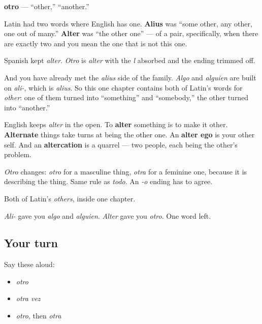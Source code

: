 \begin{cousinweb}
\textbf{otro} — \textquotedblleft{}other,\textquotedblright{} \textquotedblleft{}another.\textquotedblright{}

Latin had two words where English has one. \textbf{Alius} was \textquotedblleft{}some other, any other, one out of many.\textquotedblright{} \textbf{Alter} was \textquotedblleft{}the other one\textquotedblright{} — of a pair, specifically, when there are exactly two and you mean the one that is not this one.

Spanish kept \emph{alter}. \emph{Otro} is \emph{alter} with the \emph{l} absorbed and the ending trimmed off.

And you have already met the \emph{alius} side of the family. \emph{Algo} and \emph{alguien} are built on \emph{ali-}, which is \emph{alius}. So this one chapter contains both of Latin's words for \emph{other}: one of them turned into \textquotedblleft{}something\textquotedblright{} and \textquotedblleft{}somebody,\textquotedblright{} the other turned into \textquotedblleft{}another.\textquotedblright{}

English keeps \emph{alter} in the open. To \textbf{alter} something is to make it other. \textbf{Alternate} things take turns at being the other one. An \textbf{alter ego} is your other self. And an \textbf{altercation} is a quarrel — two people, each being the other's problem.

\emph{Otro} changes: \emph{otro} for a masculine thing, \emph{otra} for a feminine one, because it is describing the thing. Same rule as \emph{todo}. An \emph{-o} ending has to agree.
\end{cousinweb}

\begin{grammarlens}[title={What you've built}]
Both of Latin's \emph{others}, inside one chapter.

\emph{Ali-} gave you \emph{algo} and \emph{alguien}. \emph{Alter} gave you \emph{otro}. One word left.
\end{grammarlens}

\subsection*{Your turn}
Say these aloud:

\begin{itemize}
\raggedright
  \item \emph{otro}
  \item \emph{otra vez}
  \item \emph{otro}, then \emph{otra}
\end{itemize}

